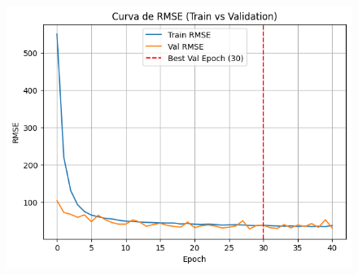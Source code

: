\begin{figure}[H]
\begin{minipage}{0.48\textwidth}
		\vspace{0.2cm}
		\includegraphics[width=\linewidth]{includes/cap5/graphs/sid2_mlp_rmse.png}
	\end{minipage}
	\label{fig:curvas_sid2_mlp}
\end{figure}

